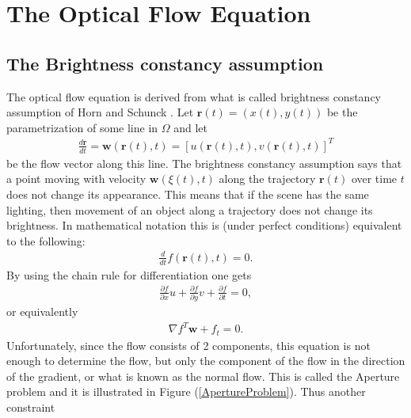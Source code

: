 \chapter{The Optical Flow Equation}
\section{The Brightness constancy assumption}
The optical flow equation is derived from what is called brightness constancy assumption of Horn and Schunck \cite{HS}. Let $\textbf{r}(t) = (x(t),y(t))$ be the parametrization of some line in $\Omega$ and let 
\begin{align*}
\frac{d \textbf{r}}{dt} = \textbf{w}(\textbf{r}(t),t) = \left[ u(\textbf{r}(t),t),v(\textbf{r}(t),t) \right]^T
\end{align*}
be the flow vector along this line. The brightness constancy assumption says that a point moving with velocity $\textbf{w}(\xi(t),t)$ along the trajectory $\textbf{r}(t)$ over time $t$ does not change its appearance. This means that if the scene has the same lighting, then movement of an object along a trajectory does not change its brightness. In mathematical notation this is (under perfect conditions) equivalent to the following:
\begin{align*}
\frac{d}{dt}f(\textbf{r}(t),t) = 0.
\end{align*}
By using the chain rule for differentiation one gets
\begin{align*}
\frac{\partial f}{\partial x} u + \frac{\partial f}{\partial y} v + \frac{\partial f}{\partial t} = 0,
\end{align*}
or equivalently
\begin{align}
\nabla f^T  \textbf{w} + f_t = 0.
\end{align}
Unfortunately, since the flow consists of 2 components, this equation is not enough to determine the flow, but only the component of the flow in the direction of the gradient, or what is known as the normal flow. This is called the Aperture problem and it is illustrated in Figure (\ref{ApertureProblem}). Thus another constraint 

